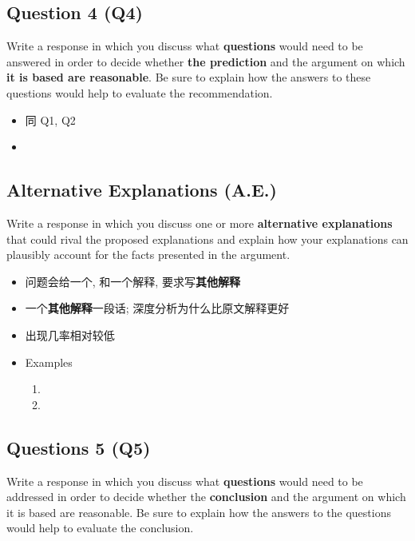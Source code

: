   \subsection{Question 4 (Q4)}

    Write a response in which you discuss what \textbf{questions} would need
    to be answered in order to decide whether \textbf{the prediction} and
    the argument on which \textbf{it is based are reasonable}.
    Be sure to explain how the answers to these questions would help to
    evaluate the recommendation.

    \begin{itemize}
      \item 同 Q1, Q2
      \item {}
    \end{itemize}

  \subsection{Alternative Explanations (A.E.)}

    Write a response in which you discuss one or more
    \textbf{alternative explanations} that could rival the proposed
    explanations and explain how your explanations can plausibly account for
    the facts presented in the argument.

    \begin{itemize}
      \item 问题会给一个, 和一个解释, 要求写\textbf{其他解释}
      \item 一个\textbf{其他解释}一段话; 深度分析为什么比原文解释更好
      \item 出现几率相对较低
      \item Examples
      \begin{enumerate}
        \item {}
        \item {}
      \end{enumerate}
    \end{itemize}

  \subsection{Questions 5 (Q5)}

    Write a response in which you discuss what \textbf{questions} would need
    to be addressed in order to decide whether the \textbf{conclusion} and the
    argument on which it is based are reasonable. Be sure to explain how the
    answers to the questions would help to evaluate the conclusion.

